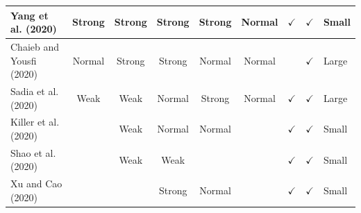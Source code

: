 \documentclass[../access.tex]{subfiles}
\begin{document}
\begin{table}[htbp]
\begin{adjustwidth}{-2cm}{}
\begin{tabular}{m{4.4cm} c c c c c c c >{\centering\arraybackslash}m{0.7cm}}
            \hline
            \footnotesize{Yang et al. (2020) \cite{Yang2020}}              & {Strong}                                                                                    & {Strong}                                         & {Strong}               & {Strong}                     & {Normal}                  & $ \checkmark $          & $ \checkmark $            & \footnotesize{Small} \\
            \hline
            \footnotesize{Chaieb and Yousfi (2020) \cite{Chaieb2020}}      & {Normal}                                                                                    & {Strong}                                         & {Strong}               & {Normal}                     & {Normal}                  & {}                      & $ \checkmark $            & \footnotesize{Large} \\
            \hline
            \footnotesize{Sadia et al. (2020) \cite{Sadia2020}}            & {Weak}                                                                                      & {Weak}                                           & {Normal}               & {Strong}                     & {Normal}                  & $ \checkmark $          & $ \checkmark $            & \footnotesize{Large} \\
            \hline
            \footnotesize{Killer et al. (2020) \cite{Killer2020}}          & {}                                                                                          & {Weak}                                           & {Normal}               & {Normal}                     & {}                        & $ \checkmark $          & $ \checkmark $            & \footnotesize{Small} \\
            \hline
            \footnotesize{Shao et al. (2020) \cite{Shao2020}}              & {}                                                                                          & {Weak}                                           & {Weak}                 & {}                           & {}                        & $ \checkmark $          & $ \checkmark $            & \footnotesize{Small} \\
            \hline
            \footnotesize{Xu and Cao (2020) \cite{Xu2020}}                 & {}                                                                                          & {}                                               & {Strong}               & {Normal}                     & {}                        & $ \checkmark $          & $ \checkmark $            & \footnotesize{Small} \\

\end{tabular}
\end{adjustwidth}
\end{table}
\end{document}
